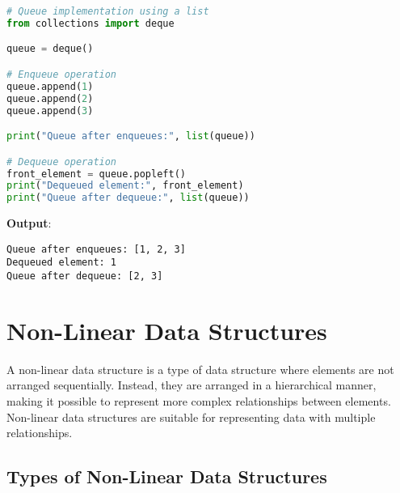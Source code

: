 \documentclass{article}
\begin{document}
\begin{lstlisting}[language=Python, caption=Queue implementation using a list]
# Queue implementation using a list
from collections import deque

queue = deque()

# Enqueue operation
queue.append(1)
queue.append(2)
queue.append(3)

print("Queue after enqueues:", list(queue))

# Dequeue operation
front_element = queue.popleft()
print("Dequeued element:", front_element)
print("Queue after dequeue:", list(queue))
\end{lstlisting}

\textbf{Output}:
\begin{verbatim}
Queue after enqueues: [1, 2, 3]
Dequeued element: 1
Queue after dequeue: [2, 3]
\end{verbatim}
\section{Non-Linear Data Structures}

A non-linear data structure is a type of data structure where elements are not arranged sequentially. Instead, they are arranged in a hierarchical manner, making it possible to represent more complex relationships between elements. Non-linear data structures are suitable for representing data with multiple relationships.

\subsection{Types of Non-Linear Data Structures}
\end{document}
